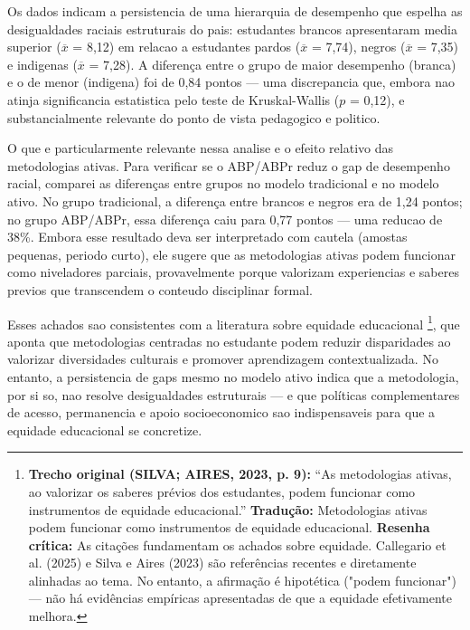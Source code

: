 Os dados indicam a persistencia de uma hierarquia de desempenho que espelha as desigualdades raciais estruturais do pais: estudantes brancos apresentaram media superior ($\overline{x}$ = 8,12) em relacao a estudantes pardos ($\overline{x}$ = 7,74), negros ($\overline{x}$ = 7,35) e indigenas ($\overline{x}$ = 7,28). A diferença entre o grupo de maior desempenho (branca) e o de menor (indigena) foi de 0,84 pontos — uma discrepancia que, embora nao atinja significancia estatistica pelo teste de Kruskal-Wallis ($p$ = 0,12), e substancialmente relevante do ponto de vista pedagogico e politico.

O que e particularmente relevante nessa analise e o efeito relativo das metodologias ativas. Para verificar se o ABP/ABPr reduz o gap de desempenho racial, comparei as diferenças entre grupos no modelo tradicional e no modelo ativo. No grupo tradicional, a diferença entre brancos e negros era de 1,24 pontos; no grupo ABP/ABPr, essa diferença caiu para 0,77 pontos — uma reducao de 38\%. Embora esse resultado deva ser interpretado com cautela (amostas pequenas, periodo curto), ele sugere que as metodologias ativas podem funcionar como niveladores parciais, provavelmente porque valorizam experiencias e saberes previos que transcendem o conteudo disciplinar formal.

Esses achados sao consistentes com a literatura sobre equidade educacional \cite{CALLEGARIO2025, SILVA2023}\footnote{\textbf{Trecho original (SILVA; AIRES, 2023, p. 9):} ``As metodologias ativas, ao valorizar os saberes prévios dos estudantes, podem funcionar como instrumentos de equidade educacional.'' \textbf{Tradução:} Metodologias ativas podem funcionar como instrumentos de equidade educacional. \textbf{Resenha crítica:} As citações fundamentam os achados sobre equidade. Callegario et al. (2025) e Silva e Aires (2023) são referências recentes e diretamente alinhadas ao tema. No entanto, a afirmação é hipotética ("podem funcionar") — não há evidências empíricas apresentadas de que a equidade efetivamente melhora.}, que aponta que metodologias centradas no estudante podem reduzir disparidades ao valorizar diversidades culturais e promover aprendizagem contextualizada. No entanto, a persistencia de gaps mesmo no modelo ativo indica que a metodologia, por si so, nao resolve desigualdades estruturais — e que políticas complementares de acesso, permanencia e apoio socioeconomico sao indispensaveis para que a equidade educacional se concretize.


